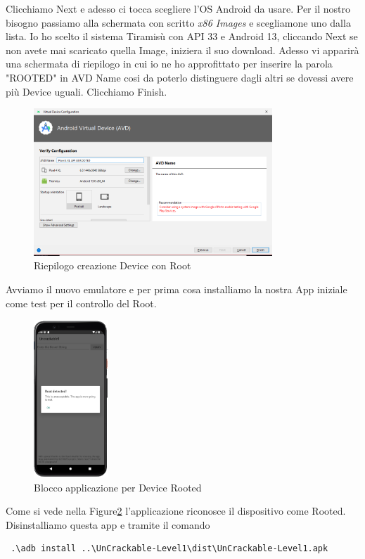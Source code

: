 \documentclass{article}
\begin{document}
Clicchiamo Next e adesso ci tocca scegliere l'OS Android da usare. Per il nostro bisogno passiamo alla schermata con scritto \textit{x86 Images} e scegliamone uno 
dalla lista. Io ho scelto il sistema Tiramisù con API 33 e Android 13, cliccando Next se non avete mai scaricato quella Image, iniziera il suo download.
Adesso vi apparirà una schermata di riepilogo in cui io ne ho approfittato per inserire la parola "ROOTED" in AVD Name cosi da poterlo distinguere dagli altri 
se dovessi avere più Device uguali. Clicchiamo Finish.
\begin{figure}[htbp]
    \centering
    \includegraphics[width=0.8\textwidth]{./uncrackable1/Tiramisu.png}
    \captionsetup{labelformat=empty}
    \caption{Riepilogo creazione Device con Root}
    \label{fig:AVDRoot}
\end{figure}
\newpage
Avviamo il nuovo emulatore e per prima cosa installiamo la nostra App iniziale come test per il controllo del Root.

\begin{figure}[h]
    \centering
    \includegraphics[width=0.25\textwidth]{./uncrackable1/primoTestRoot.png}
    \caption{Blocco applicazione per Device Rooted}
    \label{fig:rooted}
\end{figure}
Come si vede nella Figure\ref*{fig:rooted} l'applicazione riconosce il dispositivo come Rooted. Disinstalliamo questa app e tramite il comando 
\begin{verbatim}
 .\adb install ..\UnCrackable-Level1\dist\UnCrackable-Level1.apk
\end{verbatim}
\end{document}
